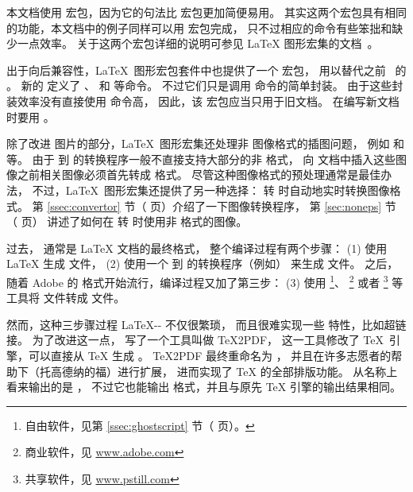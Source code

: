 本文档使用  宏包，因为它的句法比  宏包更加简便易用。
其实这两个宏包具有相同的功能，本文档中的例子同样可以用  宏包完成，
只不过相应的命令有些笨拙和缺少一点效率。
关于这两个宏包详细的说明可参见 \LaTeX{} 图形宏集的文档~\cite{grfguide}。

出于向后兼容性，\LaTeX\ 图形宏包套件中也提供了一个  宏包，
用以替代之前 \LaTeXe\ 的 。
新的 定义了 、 和  等命令。
不过它们只是调用  命令的简单封装。
由于这些封装效率没有直接使用  命令高，
因此，该  宏包应当只用于旧文档。
在编写新文档时要用 。

除了改进  图片的部分，\LaTeX{}~图形宏集还处理非  图像格式的插图问题，
例如 和 等。
由于  到  的转换程序一般不直接支持大部分的非 格式，
向  文档中插入这些图像之前相关图像必须首先转成  格式。
尽管这种图像格式的预处理通常是最佳办法，
不过，\LaTeX\ 图形宏集还提供了另一种选择： 转  时自动地实时转换图像格式。
第 \ref{ssec:convertor} 节（\pageref{ssec:convertor} 页）介绍了一下图像转换程序，
第 \ref{sec:noneps} 节（\pageref{sec:noneps} 页） 讲述了如何在  转  时使用非  格式的图像。

过去， 通常是 \LaTeX{} 文档的最终格式，
\marginpar{\pdfTeX}
整个编译过程有两个步骤：
(1) 使用 \LaTeX{} 生成  文件，
(2) 使用一个  到  的转换程序（例如） 来生成  文件。
之后，随着 Adobe 的  格式开始流行，编译过程又加了第三步：
(3) 使用 
\footnote{自由软件，见第 \ref{ssec:ghostscript} 节（\pageref{ssec:ghostscript} 页）。}、
\footnote{商业软件，见 \url{www.adobe.com}}
或者 
\footnote{共享软件，见 \url{www.pstill.com}}
等工具将  文件转成  文件。

然而，这种三步骤过程 \LaTeX-- 不仅很繁琐，
而且很难实现一些  特性，比如超链接。
为了改进这一点，\HanTheThanh{} 写了一个工具叫做 \TeX2PDF，
这一工具修改了 \TeX\ 引擎，可以直接从 \TeX{} 生成 。
\TeX2PDF 最终重命名为 \pdfTeX，
并且在许多志愿者的帮助下（托高德纳的福）进行扩展，
进而实现了 \TeX{} 的全部排版功能。
\pdfTeX 从名称上看来输出的是 ，
不过它也能输出  格式，并且与原先 \TeX{} 引擎的输出结果相同。

